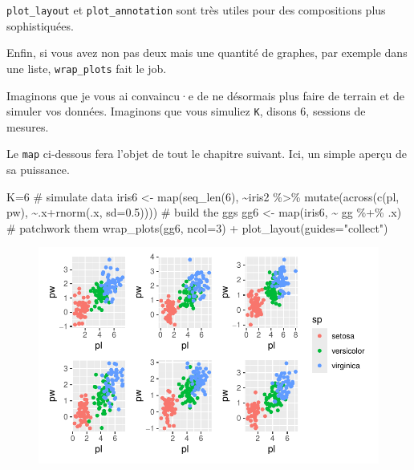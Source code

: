 \documentclass[
  letterpaper,
  DIV=11,
  numbers=noendperiod]{scrreprt}
\newenvironment{Shaded}{\begin{snugshade}}{\end{snugshade}}
\newcommand{\AttributeTok}[1]{\textcolor[rgb]{0.40,0.45,0.13}{#1}}
\newcommand{\CommentTok}[1]{\textcolor[rgb]{0.37,0.37,0.37}{#1}}
\newcommand{\DecValTok}[1]{\textcolor[rgb]{0.68,0.00,0.00}{#1}}
\newcommand{\FloatTok}[1]{\textcolor[rgb]{0.68,0.00,0.00}{#1}}
\newcommand{\FunctionTok}[1]{\textcolor[rgb]{0.28,0.35,0.67}{#1}}
\newcommand{\NormalTok}[1]{\textcolor[rgb]{0.00,0.23,0.31}{#1}}
\newcommand{\OtherTok}[1]{\textcolor[rgb]{0.00,0.23,0.31}{#1}}
\newcommand{\SpecialCharTok}[1]{\textcolor[rgb]{0.37,0.37,0.37}{#1}}
\newcommand{\StringTok}[1]{\textcolor[rgb]{0.13,0.47,0.30}{#1}}
\begin{document}
\texttt{plot\_layout} et \texttt{plot\_annotation} sont très utiles pour
des compositions plus sophistiquées.

Enfin, si vous avez non pas deux mais une quantité de graphes, par
exemple dans une liste, \texttt{wrap\_plots} fait le job.

Imaginons que je vous ai convaincu·e de ne désormais plus faire de
terrain et de simuler vos données. Imaginons que vous simuliez
\texttt{K}, disons 6, sessions de mesures.

Le \texttt{map} ci-dessous fera l'objet de tout le chapitre suivant.
Ici, un simple aperçu de sa puissance.

\begin{Shaded}
\begin{Highlighting}[]
\NormalTok{K}\OtherTok{=}\DecValTok{6}
\CommentTok{\# simulate data}
\NormalTok{iris6 }\OtherTok{\textless{}{-}} \FunctionTok{map}\NormalTok{(}\FunctionTok{seq\_len}\NormalTok{(}\DecValTok{6}\NormalTok{), }
              \SpecialCharTok{\textasciitilde{}}\NormalTok{iris2 }\SpecialCharTok{\%\textgreater{}\%} \FunctionTok{mutate}\NormalTok{(}\FunctionTok{across}\NormalTok{(}\FunctionTok{c}\NormalTok{(pl, pw), }\SpecialCharTok{\textasciitilde{}}\NormalTok{.x}\SpecialCharTok{+}\FunctionTok{rnorm}\NormalTok{(.x, }\AttributeTok{sd=}\FloatTok{0.5}\NormalTok{))))}
\CommentTok{\# build the ggs}
\NormalTok{gg6 }\OtherTok{\textless{}{-}} \FunctionTok{map}\NormalTok{(iris6, }\SpecialCharTok{\textasciitilde{}}\NormalTok{ gg }\SpecialCharTok{\%+\%}\NormalTok{ .x)}
\CommentTok{\# patchwork them}
\FunctionTok{wrap\_plots}\NormalTok{(gg6, }\AttributeTok{ncol=}\DecValTok{3}\NormalTok{) }\SpecialCharTok{+} \FunctionTok{plot\_layout}\NormalTok{(}\AttributeTok{guides=}\StringTok{"collect"}\NormalTok{)}
\end{Highlighting}
\end{Shaded}

\begin{figure}[H]

{\centering \includegraphics{ggplot2_files/figure-pdf/unnamed-chunk-36-1.pdf}

}

\end{figure}
\end{document}
